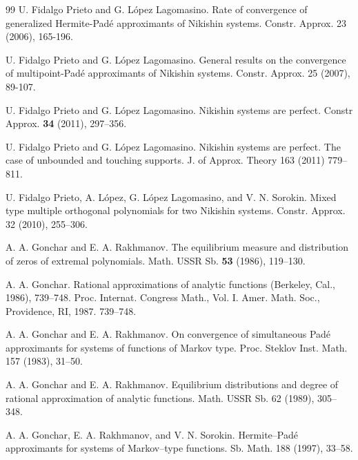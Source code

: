 \documentclass{amsart}
\theoremstyle{definition}
\theoremstyle{remark}
\begin{document}
\begin{thebibliography}{99}
U. Fidalgo Prieto and G. L\'opez Lagomasino.  Rate of convergence
of generalized Hermite-Pad\'{e} approximants of Nikishin systems.
Constr. Approx.  23 (2006), 165-196.

U. Fidalgo Prieto and G. L\'opez Lagomasino.  General results on
the convergence of multipoint-Pad\'e approximants of Nikishin
systems. Constr. Approx.  25 (2007), 89-107.

 U. Fidalgo Prieto and G. López Lagomasino. Nikishin systems are perfect. Constr Approx. {\bf 34} (2011), 297–356.

 U. Fidalgo Prieto and G. López Lagomasino. Nikishin systems are perfect. The case of unbounded
and touching supports. J. of Approx. Theory 163 (2011) 779–811.


U. Fidalgo Prieto, A. L\'{o}pez, G. L\'opez Lagomasino, and V. N. Sorokin. Mixed type multiple orthogonal polynomials for two Nikishin systems. Constr. Approx. 32 (2010), 255--306.


 A. A. Gonchar and E. A. Rakhmanov. The equilibrium
measure and distribution of zeros of extremal polynomials. Math.
USSR Sb. {\bf 53} (1986), 119--130.

A. A. Gonchar. Rational approximations of analytic functions (Berkeley, Cal., 1986), 739--748. Proc. Internat. Congress Math., Vol. I. Amer. Math. Soc., Providence, RI, 1987. 739--748.

 A. A. Gonchar and E. A. Rakhmanov. On convergence of simultaneous Pad\'e approximants for systems of functions of Markov type. Proc. Steklov Inst. Math.  157 (1983), 31--50.

  A. A. Gonchar and  E. A. Rakhmanov. Equilibrium distributions and degree of rational approximation of analytic functions.  Math. USSR Sb.  62 (1989), 305--348.

 A. A.  Gonchar, E. A. Rakhmanov, and  V. N. Sorokin. Hermite--Pad\'e approximants for systems of Markov--type functions. Sb. Math.  188 (1997), 33--58.


\end{thebibliography}
\end{document}
